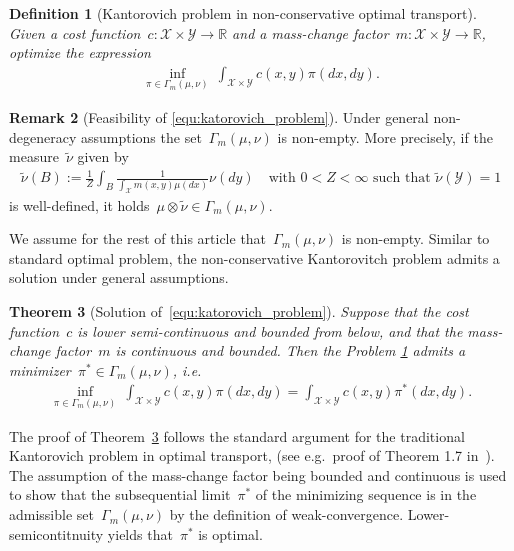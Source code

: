 \documentclass{article}
\newtheorem{theorem}{Theorem}[section]
\newtheorem{definition}[theorem]{Definition}
\theoremstyle{definition}
\newtheorem{remark}[theorem]{Remark}
\begin{document}
\begin{definition}[Kantorovich problem in non-conservative optimal transport] \label{lossyOTplans}
 Given a cost function~$c: \mathcal X \times \mathcal{Y} \to \mathbb{R}$ and  a mass-change factor~$m: \mathcal{X} \times \mathcal{Y} \to \mathbb{R}$, optimize the expression
\begin{align}
\inf_{\pi \in \Gamma_m(\mu, \nu)}  \ \int_{\mathcal{X} \times \mathcal{Y} } c(x,y) \pi(dx,dy) .   \tag{KP}   \label{equ:katorovich_problem}
\end{align}
\end{definition}
\begin{remark}[Feasibility of \eqref{equ:katorovich_problem}]
    Under general non-degeneracy assumptions the set~$\Gamma_{m}(\mu, \nu)$ is non-empty. More precisely, if the measure~$\tilde \nu$ given by 
    \begin{align*}
        \tilde \nu(B) := \frac{1}{Z}\int_{B} \frac{1}{\int_{\mathcal{X}}  m(x,y) \mu(dx)} \nu(dy) \quad \mbox{with~$0<Z<\infty$ such that }  \tilde\nu (\mathcal{Y}) =1
    \end{align*}
    is well-defined, it holds~$\mu \otimes \tilde \nu \in \Gamma_{m} (\mu, \nu)$.
\end{remark}
We assume for the rest of this article that~$\Gamma_m(\mu, \nu)$ is non-empty. Similar to standard optimal problem, the non-conservative Kantorovitch problem admits a solution under general assumptions.
\begin{theorem}[Solution of~\eqref{equ:katorovich_problem}]\label{the:solution_KP}
	Suppose that the cost function~$c$ is lower semi-continuous and bounded from below, and that the mass-change factor~$m$ is continuous and bounded. Then the Problem \ref{lossyOTplans} admits a minimizer~$\pi^* \in \Gamma_m(\mu, \nu) $, i.e.
    \begin{align}
        \inf_{\pi \in \Gamma_m(\mu, \nu)}  \ \int_{\mathcal{X} \times \mathcal{Y} } c(x,y) \pi(dx,dy)  =   \int_{\mathcal{X} \times \mathcal{Y} } c(x,y) \pi^*(dx,dy).
    \end{align}
\end{theorem}
The proof of Theorem~\ref{the:solution_KP} follows the standard argument for the traditional Kantorovich problem in optimal transport, (see e.g.~proof of Theorem 1.7 in~\cite{santambrogio2015otam}). The assumption of the mass-change factor being bounded and continuous is used to show that the subsequential limit~$\pi^*$ of the minimizing sequence is in the admissible set~$\Gamma_m(\mu, \nu)$ by the definition of weak-convergence. Lower-semicontitnuity yields that~$\pi^*$ is optimal.
\end{document}
